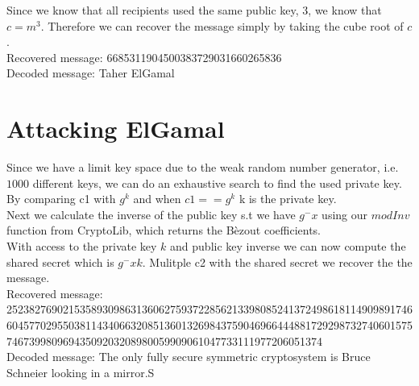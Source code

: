\documentclass{article}
\begin{document}
Since we know that all recipients used the same public key, 3, we know that $c=m^3$. Therefore we can recover the message simply by taking the cube root of $c$.\\

Recovered message: 6685311904500383729031660265836\\
Decoded message: Taher ElGamal

\section{Attacking ElGamal}

Since we have a limit key space due to the weak random number generator, i.e. $1000$ different keys,  we can do an exhaustive search to find the used private key. By comparing c1 with $g^k$ and when $c1==g^k$ k is the private key.\\

Next we calculate the inverse of the public key s.t we have $g^-x$ using our $modInv$ function from CryptoLib, which returns the Bèzout coefficients.\\

With access to the private key $k$ and public key inverse we can now compute the shared secret which is $g^-xk$. Mulitple c2 with the shared secret we recover the the message.\\

Recovered message: 25238276902153589309863136062759372285621339808524137249861811490989174660457702955038114340663208513601326984375904696644488172929873274060157574673998096943509203208980059909061047733111977206051374 \\
Decoded message: The only fully secure symmetric cryptosystem is Bruce Schneier looking in a mirror.S       
\end{document}

